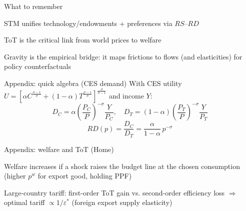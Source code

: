 \documentclass[notes,11pt, aspectratio=169, xcolor=table]{beamer}
\newenvironment{wideitemize}{\itemize\addtolength{\itemsep}{10pt}}{\enditemize}
\begin{document}
\begin{frame}{What to remember}
\begin{wideitemize}
  \item STM unifies technology/endowments + preferences via $RS$–$RD$
  \item ToT is the critical link from world prices to welfare
  \item Gravity is the empirical bridge: it maps frictions to flows (and elasticities) for policy counterfactuals
\end{wideitemize}
\end{frame}

\begin{frame}{Appendix: quick algebra (CES demand)}
\small
With CES utility $U=\left[\alpha C^{\frac{\sigma-1}{\sigma}}+(1-\alpha)T^{\frac{\sigma-1}{\sigma}}\right]^{\frac{\sigma}{\sigma-1}}$ and income $Y$:
\[
  D_C=\alpha \left(\frac{P_C}{P}\right)^{-\sigma}\frac{Y}{P_C},\quad
  D_T=(1-\alpha)\left(\frac{P_T}{P}\right)^{-\sigma}\frac{Y}{P_T}
\]
\[
  RD(p)=\frac{D_C}{D_T}=\frac{\alpha}{1-\alpha}\,p^{-\sigma}
\]
\end{frame}

\begin{frame}{Appendix: welfare and ToT (Home)}
\small
\begin{wideitemize}
  \item Welfare increases if a shock raises the budget line at the chosen consumption (higher $p^w$ for export good, holding PPF)
  \item Large-country tariff: first-order ToT gain vs. second-order efficiency loss $\Rightarrow$ optimal tariff $\propto 1/\varepsilon^{*}$ (foreign export supply elasticity)
\end{wideitemize}
\end{frame}
\end{document}
